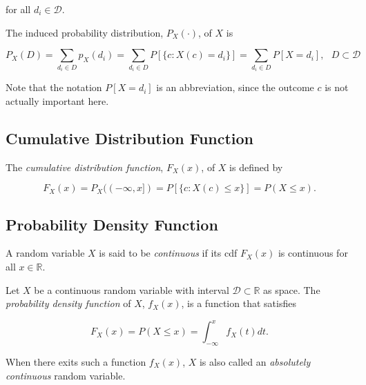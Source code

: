 \documentclass{article}
\begin{document}
            for all $ d_{i} \in \mathcal{D} $.

            The induced probability distribution, $ P_{X}(\cdot) $, of $ X $ is

            \begin{equation*}
                P_{X}(D) = \sum_{ d_{i} \in D} p_{X}(d_{i}) = \sum_{ d_{i} \in
                D} P[\{ c: X(c) = d_{i} \}] = \sum_{d_{i} \in D} P[ X = d_{i}],
                \text{ } D \subset \mathcal{D}
            \end{equation*}

            Note that the notation $ P[ X = d_{i}] $ is an abbreviation, since
            the outcome $ c $ is not actually important here.

        \subsection*{Cumulative Distribution Function}

            The \textit{cumulative distribution function}, $ F_{X}(x) $, of $ X
            $ is defined by

            \begin{equation*}
                F_{X}(x) = P_{X}((-\infty, x]) = P[\{ c: X(c) \leq x \}] = P (
                { X \leq x } ).
            \end{equation*}

        \subsection*{Probability Density Function}

            A random variable $ X $ is said to be \textit{continuous} if
            its cdf $ F_{X}(x) $ is continuous for all $ x \in \mathbb{R} $.

            Let $ X $ be a continuous random variable with interval $
            \mathcal{D} \subset \mathbb{R} $ as space. The \textit{probability
            density function} of $ X $, $ f_{X}(x) $, is a function that
            satisfies

            \begin{equation*}
                F_{X}(x) = P(X \leq x) = \int_{-\infty}^{x} f_{X}(t) dt.
            \end{equation*}

            When there exits such a function $ f_{X}(x) $, $ X $ is also called an
            \textit{absolutely continuous} random variable.
\end{document}
